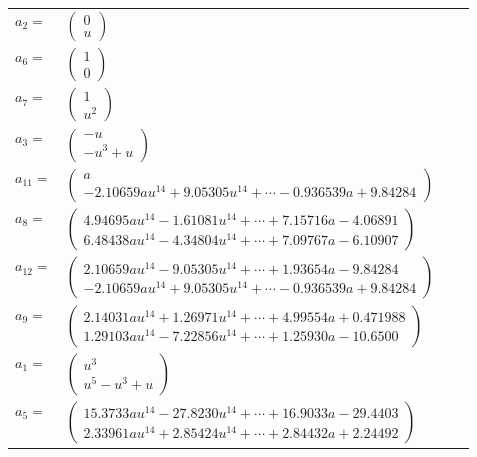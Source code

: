 \documentclass[1p]{elsarticle_modified}
\theoremstyle{definition}
\begin{document}
\begin{tabular}{m{7pt} m{180pt} m{7pt} m{180pt} }
\flushright $a_{2}=$&$\begin{pmatrix}0\\u\end{pmatrix}$ \\
\flushright $a_{6}=$&$\begin{pmatrix}1\\0\end{pmatrix}$ \\
\flushright $a_{7}=$&$\begin{pmatrix}1\\u^2\end{pmatrix}$ \\
\flushright $a_{3}=$&$\begin{pmatrix}- u\\- u^3+u\end{pmatrix}$ \\
\flushright $a_{11}=$&$\begin{pmatrix}a\\-2.10659 a u^{14}+9.05305 u^{14}+\cdots-0.936539 a+9.84284\end{pmatrix}$ \\
\flushright $a_{8}=$&$\begin{pmatrix}4.94695 a u^{14}-1.61081 u^{14}+\cdots+7.15716 a-4.06891\\6.48438 a u^{14}-4.34804 u^{14}+\cdots+7.09767 a-6.10907\end{pmatrix}$ \\
\flushright $a_{12}=$&$\begin{pmatrix}2.10659 a u^{14}-9.05305 u^{14}+\cdots+1.93654 a-9.84284\\-2.10659 a u^{14}+9.05305 u^{14}+\cdots-0.936539 a+9.84284\end{pmatrix}$ \\
\flushright $a_{9}=$&$\begin{pmatrix}2.14031 a u^{14}+1.26971 u^{14}+\cdots+4.99554 a+0.471988\\1.29103 a u^{14}-7.22856 u^{14}+\cdots+1.25930 a-10.6500\end{pmatrix}$ \\
\flushright $a_{1}=$&$\begin{pmatrix}u^3\\u^5- u^3+u\end{pmatrix}$ \\
\flushright $a_{5}=$&$\begin{pmatrix}15.3733 a u^{14}-27.8230 u^{14}+\cdots+16.9033 a-29.4403\\2.33961 a u^{14}+2.85424 u^{14}+\cdots+2.84432 a+2.24492\end{pmatrix}$ \\

\end{tabular}
\end{document}
